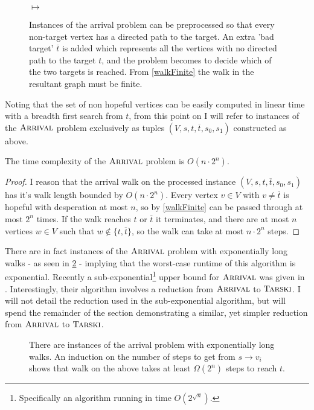 \begin{figure}[ht]
  \centering
  \raisebox{-0.5\height}{}
  \hfil
  $\mapsto$
  \hfil
  \raisebox{-0.5\height}{}
  \caption{Instances of the arrival problem can be preprocessed so that every non-target vertex
  has a directed path to the target. An extra 'bad target' $\overline{t}$ is added which represents
  all the vertices with no directed path to the target $t$, and the problem becomes to decide
  which of the two targets is reached. From \cref{walkFinite} 
  the walk in the resultant graph must be finite.}\label{arrivalPreprocess}
\end{figure}
Noting that the set of non hopeful vertices can be easily computed in linear time with a breadth first search
from $t$, from this point on I will refer
to instances of the $\textsc{Arrival}$ problem exclusively as tuples $(V, s, t, \overline{t}, s_0, s_1)$ 
constructed as above.
\begin{cor}
  The time complexity of the $\textsc{Arrival}$ problem is $O(n \cdot 2^n)$.
\end{cor}
\begin{proof}
  I reason that the arrival walk on the processed instance $(V, s, t, \overline{t}, s_0, s_1)$
  has it's walk length bounded by $O(n \cdot 2^n)$. Every vertex $v \in V$ with $v \neq \overline{t}$
  is hopeful with desperation at most $n$, so by \cref{walkFinite} can be passed through at most
  $2^{n}$ times. If the walk reaches $t$ or $\overline{t}$ it terminates, and there are at most
  $n$ vertices $w \in V$ such that $w \not\in \{t, \overline{t}\}$, so the walk can take at most
  $n \cdot 2^n$ steps.
\end{proof}
There are in fact instances of the $\textsc{Arrival}$ problem with exponentially long walks -
as seen in \cref{expLongArrival} - implying that the worst-case runtime of this algorithm is exponential.
Recently a sub-exponential\footnote{Specifically an algorithm running
in time $O(2^{\sqrt{n}})$.} upper bound for $\textsc{Arrival}$ was given in \citep{gärtner2021subexponential}.
Interestingly, their algorithm involves a reduction from $\textsc{Arrival}$ to $\textsc{Tarski}$. I will not detail
the reduction used in the sub-exponential algorithm, but will spend the remainder of the section
demonstrating a similar, yet simpler reduction from $\textsc{Arrival}$ to $\textsc{Tarski}$.
\begin{figure}[h]
  \centering
  
  \caption{There are instances of the arrival problem with exponentially long walks. An induction
  on the number of steps to get from $s \to v_i$ shows that walk on the above
  takes at least $\Omega(2^n)$ steps to reach $t$.}\label{expLongArrival}
\end{figure}
